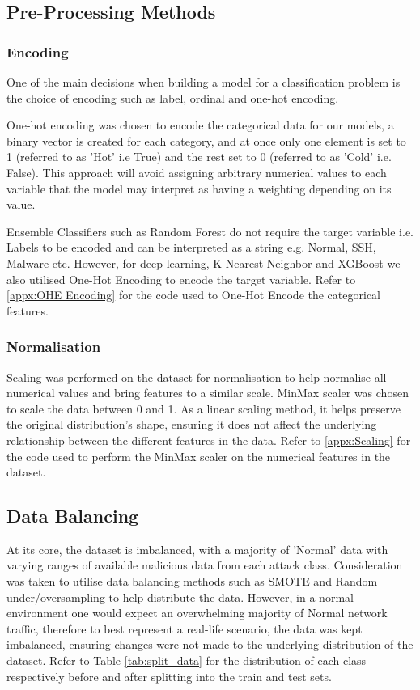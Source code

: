 \subsection{Pre-Processing Methods}

\subsubsection{Encoding}

One of the main decisions when building a model for a classification problem is the choice of encoding such as label, ordinal and one-hot encoding.

One-hot encoding was chosen to encode the categorical data for our models, a binary vector is created for each category, and at once only one element is set to 1 (referred to as 'Hot' i.e True) and the rest set to 0 (referred to as 'Cold' i.e. False). This approach will avoid assigning arbitrary numerical values to each variable that the model may interpret as having a weighting depending on its value. 

Ensemble Classifiers such as Random Forest do not require the target variable i.e. Labels to be encoded and can be interpreted as a string e.g. Normal, SSH, Malware etc. However, for deep learning, K-Nearest Neighbor and XGBoost we also utilised One-Hot Encoding to encode the target variable. Refer to \ref{appx:OHE Encoding} for the code used to One-Hot Encode the categorical features. 


\subsubsection{Normalisation}

Scaling was performed on the dataset for normalisation to help normalise all numerical values and bring features to a similar scale. MinMax scaler was chosen to scale the data between 0 and 1. As a linear scaling method, it helps preserve the original distribution's shape, ensuring it does not affect the underlying relationship between the different features in the data. Refer to \ref{appx:Scaling} for the code used to perform the MinMax scaler on the numerical features in the dataset.

\subsection{Data Balancing}

At its core, the dataset is imbalanced, with a majority of 'Normal' data with varying ranges of available malicious data from each attack class. Consideration was taken to utilise data balancing methods such as SMOTE and Random under/oversampling to help distribute the data. However, in a normal environment one would expect an overwhelming majority of Normal network traffic, therefore to best represent a real-life scenario, the data was kept imbalanced, ensuring changes were not made to the underlying distribution of the dataset. Refer to Table \ref{tab:split_data} for the distribution of each class respectively before and after splitting into the train and test sets.


